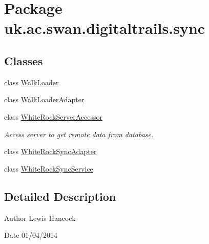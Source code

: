 \hypertarget{namespaceuk_1_1ac_1_1swan_1_1digitaltrails_1_1sync}{\section{Package uk.\+ac.\+swan.\+digitaltrails.\+sync}
\label{namespaceuk_1_1ac_1_1swan_1_1digitaltrails_1_1sync}
}
\subsection*{Classes}
\begin{DoxyCompactItemize}
\item 
class \hyperlink{classuk_1_1ac_1_1swan_1_1digitaltrails_1_1sync_1_1_walk_loader}{Walk\+Loader}
\item 
class \hyperlink{classuk_1_1ac_1_1swan_1_1digitaltrails_1_1sync_1_1_walk_loader_adapter}{Walk\+Loader\+Adapter}
\item 
class \hyperlink{classuk_1_1ac_1_1swan_1_1digitaltrails_1_1sync_1_1_white_rock_server_accessor}{White\+Rock\+Server\+Accessor}
\begin{DoxyCompactList}\small\item\em Access server to get remote data from database. \end{DoxyCompactList}\item 
class \hyperlink{classuk_1_1ac_1_1swan_1_1digitaltrails_1_1sync_1_1_white_rock_sync_adapter}{White\+Rock\+Sync\+Adapter}
\item 
class \hyperlink{classuk_1_1ac_1_1swan_1_1digitaltrails_1_1sync_1_1_white_rock_sync_service}{White\+Rock\+Sync\+Service}
\end{DoxyCompactItemize}


\subsection{Detailed Description}
\begin{DoxyAuthor}{Author}
Lewis Hancock 
\end{DoxyAuthor}
\begin{DoxyDate}{Date}
01/04/2014 
\end{DoxyDate}
